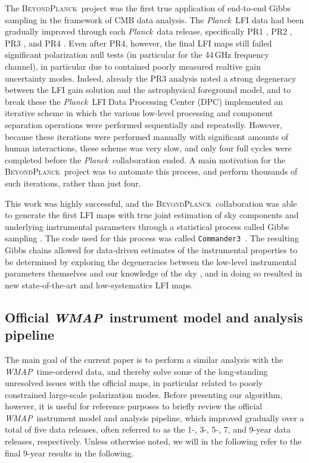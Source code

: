 \documentclass[twocolumn]{../../common/aa}
\def\WMAP{\emph{WMAP}}
\def\Planck{\emph{Planck}}
\def\commanderthree{\texttt{Commander3}}
\newcommand{\BP}{\textsc{BeyondPlanck}}
\newcommand{\bp}{\textsc{BeyondPlanck}}
\begin{document}
The \bp\ project \citep{bp01} was the first true application of end-to-end Gibbs sampling in the framework of CMB data analysis. The \Planck\ LFI data had been gradually improved through each \Planck\ data release, specifically  PR1 \citep{planck2014-a03}, PR2 \citep{planck2014-a03}, PR3 \citep{planck2016-l02}, and PR4 \citep{planck2014-a03}. Even after PR4, however, the final LFI maps still failed significant polarization null tests (in particular for the 44\,GHz frequency channel), in particular due to contained poorly measured realtive gain uncertainty modes. Indeed, already the PR3 analysis noted a strong degeneracy between the LFI gain solution and the astrophysical foreground model, and to break these the \Planck\ LFI Data Processing Center (DPC) implemented an iterative scheme in which the various low-level processing and component separation operations were performed sequentially and repeatedly. However, because these iterations were performed manually with significant amounts of human interactions, these scheme was very slow, and only four full cycles were completed before the \Planck\ collaboration ended. A main motivation for the \BP\ project was to automate this process, and perform thousands of such iterations, rather than just four. 

This work was highly successful, and the \bp\ collaboration was able to generate the first LFI maps with true joint estimation of sky components and underlying instrumental parameters through a statistical process called Gibbs sampling \citep{bp01,bp03,bp10}. The code used for this process was called \commanderthree\ \citep{bp03}. The resulting Gibbs chains allowed for data-driven estimates of the instrumental properties to be determined by exploring the degeneracies between the low-level instrumental parameters themselves and our knowledge of the sky \citep{bp13,bp14}, and in doing so resulted in new state-of-the-art and low-systematics LFI maps.

\subsection{Official \WMAP\ instrument model and analysis pipeline}
\label{sec:official_pipeline}

The main goal of the current paper is to perform a similar analysis with the \WMAP\ time-ordered data, and thereby solve some of the long-standing unresolved issues with the official maps, in particular related to poorly constrained large-scale polarization modes. Before presenting our algorithm, however, it is useful for reference purposes to briefly review the official \WMAP\ instrument model and analysis pipeline, which improved gradually over a total of five data releases, often referred to as the 1-, 3-, 5-, 7, and 9-year data releases, respectively. Unless otherwise noted, we will in the following refer to the final 9-year results in the following.
\end{document}
